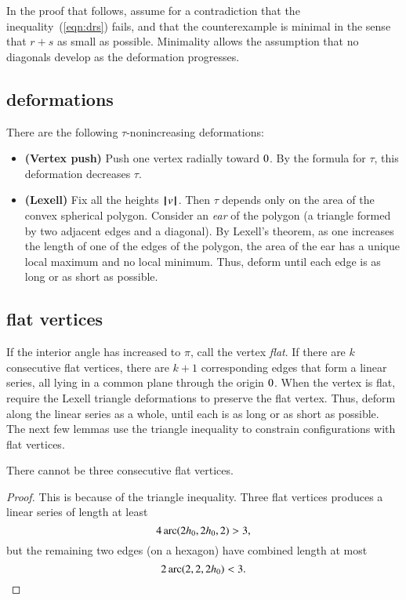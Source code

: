 {In the proof that follows,  assume for a contradiction that the
inequality~(\ref{eqn:drs}) fails, and that the counterexample is minimal in the sense that $r+s$ as small as possible.   Minimality allows the assumption that no diagonals develop as the deformation progresses.

\subsection{deformations}

There are the following $\tau$-nonincreasing deformations:
\begin{itemize}
\item {\bf (Vertex push)} Push one vertex radially toward $0$.  By the formula for $\tau$, this deformation decreases $\tau$.
\item {\bf (Lexell)} Fix all the heights ${{\hskip0.1em|\hskip-0.15em|\hskip0.1em}v{\hskip0.1em|\hskip-0.15em|\hskip0.1em}}$. Then $\tau$ depends only on the area of the convex spherical polygon.  Consider an {\it ear} of the polygon (a triangle formed by two adjacent edges and a diagonal).  By Lexell's theorem, as one increases the length of one of the edges of the polygon, the area of the ear has a unique local maximum and no local minimum.  Thus,  deform until each edge is as long or as short as possible.
\end{itemize}

\subsection{flat vertices}


If the interior angle has increased to $\pi$, call the vertex {\it flat}. If there are $k$ consecutive flat vertices, there are  $k+1$ corresponding edges that form a linear series, all lying in a common plane through the origin $0$.  When the vertex is flat, require the Lexell triangle deformations to preserve the flat vertex.  Thus,  deform along the linear series as a whole, until each is as long or as short as possible.  The next few lemmas use the triangle inequality to constrain configurations with flat vertices.

\begin{lemma}
There cannot be three consecutive flat vertices.
\end{lemma}

\begin{proof} This is because of the triangle inequality.  Three flat vertices produces a linear series of length at least
$$
4\operatorname{arc}(2{h_0},2{h_0},2) > 3,
$$
but the remaining two edges (on a hexagon) have combined length at most
$$
2\operatorname{arc}(2,2,2{h_0}) < 3.
$$
\end{proof}

}
